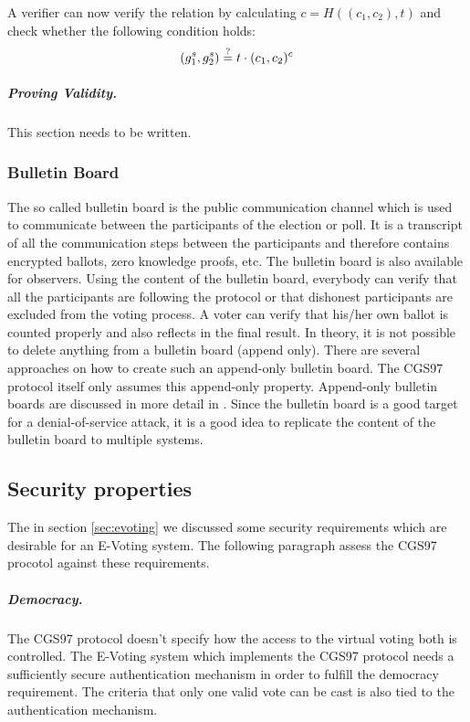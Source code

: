 \documentclass[numbers=noenddot, abstract=on, a4paper, headsepline,
footsepline, oneside, draft=off]{scrreprt}
\begin{document}
A verifier can now verify the relation by calculating
$c=H((c_1,c_2),t)$ and check whether the following condition holds:
\begin{equation}
	(g_1^s, g_2^s) \stackrel{?}{=} t \cdot (c_1, c_2)^c \notag
\end{equation}


\subparagraph{Proving Validity.}
This section needs to be written. 


\subsubsection{Bulletin Board}
\label{sec:bulletinboard}
The so called bulletin board is the public communication channel which is used
to communicate between the participants of the election or poll. It is a
transcript of all the communication steps between the participants and therefore
contains encrypted ballots, zero knowledge proofs, etc. The bulletin board is
also available for observers. Using the content of the bulletin board, everybody
can verify that all the participants are following the protocol or that
dishonest participants are excluded from the voting process. A voter can verify
that his/her own ballot is counted properly and also reflects in the final
result. In theory, it is not possible to delete anything from a bulletin board
(append only). There are several approaches on how to create such an
append-only bulletin board. The CGS97 protocol itself only assumes this
append-only property. Append-only bulletin boards are discussed in more detail
in \cite{HL09}. Since the bulletin board is a good target for a
denial-of-service attack, it is a good idea to replicate the content of the bulletin board to multiple systems.

\subsection{Security properties}
\label{sec:secproperties}
The in section \vref{sec:evoting} we discussed some security requirements which
are desirable for an E-Voting system. The following paragraph assess the CGS97
procotol against these requirements.

\subparagraph{Democracy.} The CGS97 protocol doesn't specify how the access to
the virtual voting both is controlled. The E-Voting system which implements the
CGS97 protocol needs a sufficiently secure authentication mechanism in order to
fulfill the democracy requirement. The criteria that only one valid vote can be
cast is also tied to the authentication mechanism.
\end{document}
